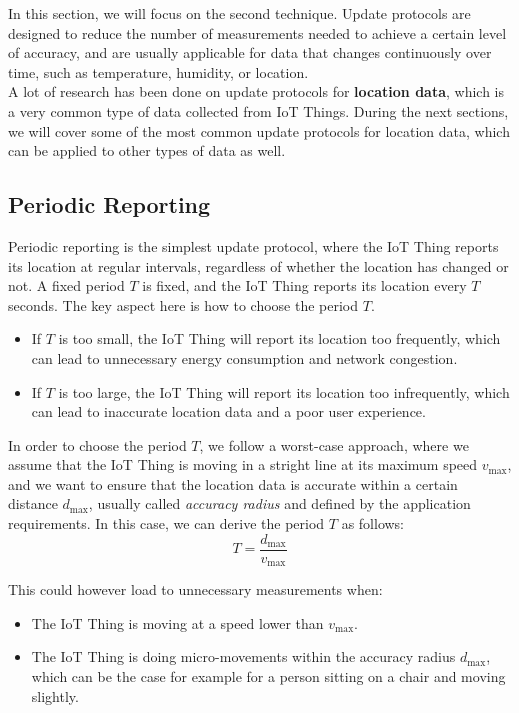 In this section, we will focus on the second technique. Update protocols are designed to reduce the number of measurements needed to achieve a certain level of accuracy, and are usually applicable for data that changes continuously over time, such as temperature, humidity, or location.\\

A lot of research has been done on update protocols for \textbf{location data}, which is a very common type of data collected from IoT Things. During the next sections, we will cover some of the most common update protocols for location data, which can be applied to other types of data as well.

\subsection{Periodic Reporting}

Periodic reporting is the simplest update protocol, where the IoT Thing reports its location at regular intervals, regardless of whether the location has changed or not. A fixed period $T$ is fixed, and the IoT Thing reports its location every $T$ seconds. The key aspect here is how to choose the period $T$.
\begin{itemize}
    \item If $T$ is too small, the IoT Thing will report its location too frequently, which can lead to unnecessary energy consumption and network congestion.
    \item If $T$ is too large, the IoT Thing will report its location too infrequently, which can lead to inaccurate location data and a poor user experience.
\end{itemize}

In order to choose the period $T$, we follow a worst-case approach, where we assume that the IoT Thing is moving in a stright line at its maximum speed $v_{\max}$, and we want to ensure that the location data is accurate within a certain distance $d_{\max}$, usually called \emph{accuracy radius} and defined by the application requirements. In this case, we can derive the period $T$ as follows:
\begin{equation*}
    T = \frac{d_{\max}}{v_{\max}}
\end{equation*}

This could however load to unnecessary measurements when:
\begin{itemize}
    \item The IoT Thing is moving at a speed lower than $v_{\max}$.
    \item The IoT Thing is doing micro-movements within the accuracy radius $d_{\max}$, which can be the case for example for a person sitting on a chair and moving slightly.
\end{itemize}

